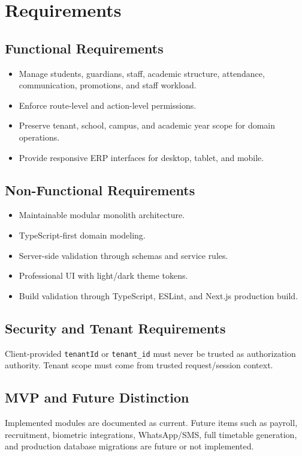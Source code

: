 \chapter{Requirements}
\section{Functional Requirements}
\begin{itemize}
\item Manage students, guardians, staff, academic structure, attendance, communication, promotions, and staff workload.
\item Enforce route-level and action-level permissions.
\item Preserve tenant, school, campus, and academic year scope for domain operations.
\item Provide responsive ERP interfaces for desktop, tablet, and mobile.
\end{itemize}

\section{Non-Functional Requirements}
\begin{itemize}
\item Maintainable modular monolith architecture.
\item TypeScript-first domain modeling.
\item Server-side validation through schemas and service rules.
\item Professional UI with light/dark theme tokens.
\item Build validation through TypeScript, ESLint, and Next.js production build.
\end{itemize}

\section{Security and Tenant Requirements}
\begin{securitybox}
Client-provided \texttt{tenantId} or \texttt{tenant\_id} must never be trusted as authorization authority. Tenant scope must come from trusted request/session context.
\end{securitybox}

\section{MVP and Future Distinction}
Implemented modules are documented as current. Future items such as payroll, recruitment, biometric integrations, WhatsApp/SMS, full timetable generation, and production database migrations are future or not implemented.
